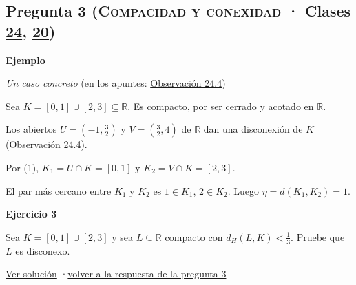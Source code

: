 \documentclass[11pt,a4paper]{article}
\newcommand{\R}{\mathbb{R}}\newcommand{\N}{\mathbb{N}}\newcommand{\Q}{\mathbb{Q}}
\providecommand{\lt}{<}\providecommand{\gt}{>}
\newcommand{\bloque}[1]{\par\smallskip\noindent\textbf{\color{acento}#1}\par}
\begin{document}
\subsection*{\hypertarget{e-3}{}Pregunta 3 \normalfont\small(\textsc{Compacidad y conexidad} · Clases \href{https://decostruttivismo.github.io/MAT2514-repaso/pdf/MAT2514_apuntes_completos.pdf\#nameddest=section.24}{24}, \href{https://decostruttivismo.github.io/MAT2514-repaso/pdf/MAT2514_apuntes_completos.pdf\#nameddest=section.20}{20})}
\bloque{Ejemplo}
\textit{Un caso concreto} {\small(en los apuntes: \href{https://decostruttivismo.github.io/MAT2514-repaso/pdf/MAT2514_apuntes_completos.pdf\#nameddest=teorema.24.4}{Observación 24.4})}
\begin{pasos}
\item[] Sea $K=[0,1]\cup[2,3]\subseteq\R$. Es compacto, por ser cerrado y acotado en $\R$.
\item[(1)] Los abiertos $U=(-1,\frac32)$ y $V=(\frac32,4)$ de $\R$ dan una disconexión de $K$ (\href{https://decostruttivismo.github.io/MAT2514-repaso/pdf/MAT2514_apuntes_completos.pdf\#nameddest=teorema.24.4}{Observación 24.4}).
\item[(2)] Por (1), $K_1=U\cap K=[0,1]$ y $K_2=V\cap K=[2,3]$.
\item[(3)] El par más cercano entre $K_1$ y $K_2$ es $1\in K_1$, $2\in K_2$. Luego $\eta=d(K_1,K_2)=1$.
\end{pasos}
\bloque{\hypertarget{x-3}{}Ejercicio 3}
Sea $K=[0,1]\cup[2,3]$ y sea $L\subseteq\R$ compacto con $d_H(L,K)\lt \frac13$. Pruebe que $L$ es disconexo.
\par{\small \hyperlink{s-3}{Ver solución} \quad·\quad \hyperlink{r-3}{volver a la respuesta de la pregunta 3}}
\end{document}
